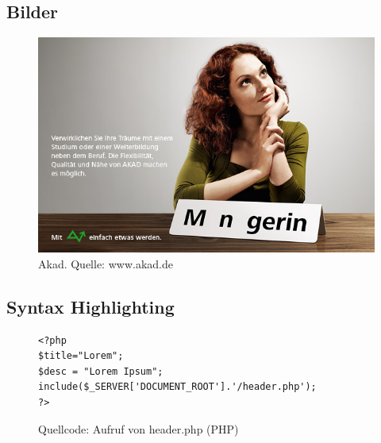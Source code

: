 \subsection{Bilder}

\begin{figure}[H]
\begin{center}
\includegraphics[scale=0.5]{akad_bild1.jpg}
\caption[Akad]{Akad. Quelle: www.akad.de}
\end{center}
\end{figure}

\subsection{Syntax Highlighting}
\begin{figure}[h]
\begin{verbatim}
<?php 
$title="Lorem";
$desc = "Lorem Ipsum";
include($_SERVER['DOCUMENT_ROOT'].'/header.php'); 
?>
\end{verbatim}
\caption{Quellcode: Aufruf von header.php (PHP)}
\label{abb:header}
\end{figure}
